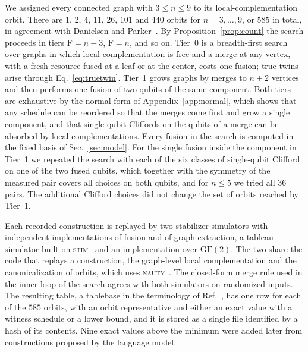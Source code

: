\documentclass[aps,pra,onecolumn,superscriptaddress,nofootinbib,longbibliography]{revtex4-2}
\theoremstyle{plain}
\theoremstyle{remark}
\newcommand{\F}{\mathrm{F}}
\begin{document}
We assigned every connected graph with $3\le n\le 9$ to its local-complementation orbit. There are
$1$, $2$, $4$, $11$, $26$, $101$ and $440$ orbits for $n=3,\dots,9$, or $585$ in total, in agreement with Danielsen and
Parker~\cite{Danielsen2006classification}. By Proposition~\ref{prop:count} the search proceeds in tiers
$\F=n-3$, $\F=n$, and so on. Tier~0 is a breadth-first search over graphs in which local complementation is
free and a merge at any vertex, with a fresh resource fused at a leaf or at the center, costs one fusion;
true twins arise through Eq.~\eqref{eq:truetwin}. Tier~1 grows graphs by merges to $n+2$ vertices and then
performs one fusion of two qubits of the same component. Both tiers are exhaustive by the normal form of
Appendix~\ref{app:normal}, which shows that any schedule can be reordered so that the merges come first
and grow a single component, and that single-qubit Cliffords on the qubits of a merge can be absorbed by
local complementations. Every fusion in the search is computed in the fixed basis of Sec.~\ref{sec:model}.
For the single fusion inside the component in Tier~1 we repeated the search with each of the six classes of
single-qubit Clifford on one of the two fused qubits, which together with the symmetry of the measured pair
covers all choices on both qubits, and for $n\le 5$ we tried all $36$ pairs. The additional Clifford
choices did not change the set of orbits reached by Tier~1.

Each recorded construction is replayed by two stabilizer simulators with independent implementations of
fusion and of graph extraction, a tableau simulator built on \textsc{stim}~\cite{Gidney2021stim} and an
implementation over $\mathrm{GF}(2)$. The two share the code that replays a construction, the graph-level
local complementation and the canonicalization of orbits, which uses \textsc{nauty}~\cite{McKay2014practical}.
The closed-form merge rule used in the inner loop of the search agrees with both simulators on randomized
inputs. The resulting table, a tablebase in the terminology of
Ref.~\cite{Lobl2025generating}, has one row for each of the $585$ orbits, with an orbit representative and
either an exact value with a witness schedule or a lower bound, and it is stored as a single file
identified by a hash of its contents. Nine exact values above the minimum were added later from constructions proposed
by the language model.
\end{document}
